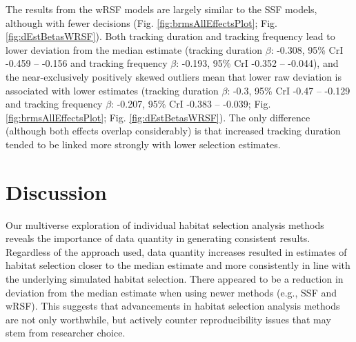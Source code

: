 \documentclass[10pt,a4paper]{article}
\begin{document}
The results from the wRSF models are largely similar to the SSF models, although with fewer decisions (Fig. \ref{fig:brmsAllEffectsPlot}; Fig. \ref{fig:dEstBetasWRSF}).
Both tracking duration and tracking frequency lead to lower deviation from the median estimate (tracking duration \(\beta\): -0.308, 95\% CrI -0.459 -- -0.156 and tracking frequency \(\beta\): -0.193, 95\% CrI -0.352 -- -0.044), and the near-exclusively positively skewed outliers mean that lower raw deviation is associated with lower estimates (tracking duration \(\beta\): -0.3, 95\% CrI -0.47 -- -0.129 and tracking frequency \(\beta\): -0.207, 95\% CrI -0.383 -- -0.039; Fig. \ref{fig:brmsAllEffectsPlot}; Fig. \ref{fig:dEstBetasWRSF}).
The only difference (although both effects overlap considerably) is that increased tracking duration tended to be linked more strongly with lower selection estimates.

\section{Discussion}\label{discussion}

Our multiverse exploration of individual habitat selection analysis methods reveals the importance of data quantity in generating consistent results.
Regardless of the approach used, data quantity increases resulted in estimates of habitat selection closer to the median estimate and more consistently in line with the underlying simulated habitat selection.
There appeared to be a reduction in deviation from the median estimate when using newer methods (e.g., SSF and wRSF).
This suggests that advancements in habitat selection analysis methods are not only worthwhile, but actively counter reproducibility issues that may stem from researcher choice.
\end{document}
